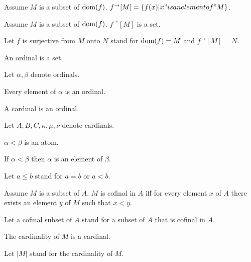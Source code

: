 \documentclass{article}
\newcommand{\image}[2]{#1^{\to}[#2]}
\newcommand{\card}[1]{\left|#1\right|}
\begin{document}
\begin{forthel}
    \begin{definition}
      Assume $M$ is a subset of $\operatorname{dom}(f)$.
      $\image{f}{M} = \{f(x) | x "is an element of" M\}$.
    \end{definition}

    \begin{axiom}
      Assume $M$ is a subset of $\operatorname{dom}(f)$.
      $\image{f}{M}$ is a set.
    \end{axiom}

    Let $f$ is surjective from $M$ onto $N$ stand for $\operatorname{dom}(f) = M$ and $\image{f}{M} = N$.

    \begin{signature}
      An ordinal is a set.
    \end{signature}

    Let $\alpha, \beta$ denote ordinals.

    \begin{axiom}
      Every element of $\alpha$ is an ordinal.
    \end{axiom}

    \begin{signature}
      A cardinal is an ordinal.
    \end{signature}

    Let $A,B,C,\kappa, \mu, \nu$ denote cardinals.

    \begin{signature}
      $\alpha < \beta$ is an atom.
    \end{signature}

    \begin{axiom}
      If $\alpha < \beta$ then $\alpha$ is an element of $\beta$.
    \end{axiom}

    Let $a \leq b$ stand for $a = b$ or $a < b$.

    \begin{definition}
      Assume $M$ is a subset of $A$. $M$ is cofinal in $A$ iff for every element $x$ of $A$ there exists an element $y$ of $M$ such that $x < y$.
    \end{definition}

    Let a cofinal subset of $A$ stand for a subset of $A$ that is cofinal in $A$.

    \begin{signature}
      The cardinality of $M$ is a cardinal.
    \end{signature}

    Let $\card{M}$ stand for the cardinality of $M$.


\end{forthel}
\end{document}
